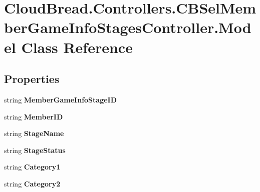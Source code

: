 \hypertarget{a00154}{}\section{Cloud\+Bread.\+Controllers.\+C\+B\+Sel\+Member\+Game\+Info\+Stages\+Controller.\+Model Class Reference}
\label{a00154}
\subsection*{Properties}
\begin{DoxyCompactItemize}
\item 
string {\bfseries Member\+Game\+Info\+Stage\+ID}\hypertarget{a00154_a984fd13e871ee3e04fc4a47912f53508}{}\label{a00154_a984fd13e871ee3e04fc4a47912f53508}

\item 
string {\bfseries Member\+ID}\hypertarget{a00154_a7da9c1fce273606f908a5802f3ba9a15}{}\label{a00154_a7da9c1fce273606f908a5802f3ba9a15}

\item 
string {\bfseries Stage\+Name}\hypertarget{a00154_a846f2602b5898c968a6358b6c3bf2914}{}\label{a00154_a846f2602b5898c968a6358b6c3bf2914}

\item 
string {\bfseries Stage\+Status}\hypertarget{a00154_a8acf10a4d058dd8469231af01987a408}{}\label{a00154_a8acf10a4d058dd8469231af01987a408}

\item 
string {\bfseries Category1}\hypertarget{a00154_aa22d4b260964141779584ac7b64c02e8}{}\label{a00154_aa22d4b260964141779584ac7b64c02e8}

\item 
string {\bfseries Category2}\hypertarget{a00154_a2b46244a72fee72c1df2160d7bd5f5b9}{}\label{a00154_a2b46244a72fee72c1df2160d7bd5f5b9}


\end{DoxyCompactItemize}
